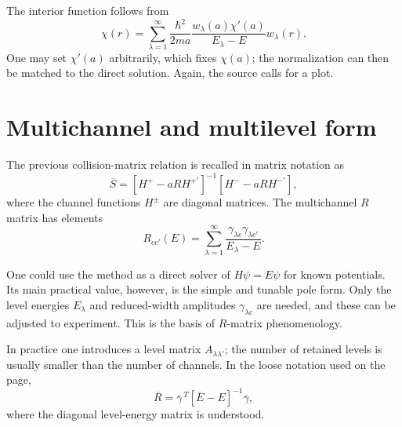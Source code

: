 The interior function follows from
\begin{equation}
  \chi(r)=
  \sum_{\lambda=1}^{\infty}
  \frac{\hbar^2}{2ma}
  \frac{w_\lambda(a)\chi'(a)}{E_\lambda-E}
  w_\lambda(r).
  \label{eq:rmat-square-well-reconstruction}
\end{equation}
One may set $\chi'(a)$ arbitrarily, which fixes $\chi(a)$; the normalization can then be matched to the direct solution.  Again, the source calls for a plot.

\section{Multichannel and multilevel form}
The previous collision-matrix relation is recalled in matrix notation as
\begin{equation}
  \overline S=
  \left[H^+-aRH^{+\prime}\right]^{-1}
  \left[H^--aRH^{-\prime}\right],
  \label{eq:rmat-S-matrix-H}
\end{equation}
where the channel functions $H^\pm$ are diagonal matrices.  The multichannel $R$ matrix has elements
\begin{equation}
  R_{cc'}(E)=
  \sum_{\lambda=1}^{\infty}
  \frac{\gamma_{\lambda c}\gamma_{\lambda c'}}{E_\lambda-E}.
  \label{eq:rmat-multichannel-elements}
\end{equation}

One could use the method as a direct solver of $H\psi=E\psi$ for known potentials.  Its main practical value, however, is the simple and tunable pole form.  Only the level energies $E_\lambda$ and reduced-width amplitudes $\gamma_{\lambda c}$ are needed, and these can be adjusted to experiment.  This is the basis of $R$-matrix phenomenology.

In practice one introduces a level matrix $A_{\lambda\lambda'}$; the number of retained levels is usually smaller than the number of channels.  In the loose notation used on the page,
\[
  \overline R
  =\overline\gamma^{\,T}
   [\overline E-E]^{-1}
   \overline\gamma,
\]
where the diagonal level-energy matrix is understood.

